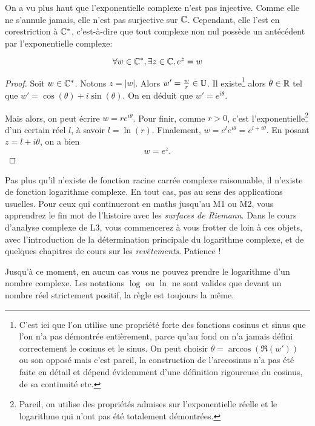 On a vu plus haut que l'exponentielle complexe n'est pas injective. Comme elle ne s'annule jamais, elle n'est pas surjective sur $\mathbb{C}$. Cependant, elle l'est en corestriction à $\mathbb{C}^*$, c'est-à-dire que tout complexe non nul possède un antécédent par l'exponentielle complexe:
\begin{proposition}
\[ \forall w\in\mathbb{C}^*, \exists z\in\mathbb{C}, e^z=w\]
\end{proposition}
\begin{proof}
Soit $w\in\mathbb{C}^*$. Notons $z=|w|$. Alors $w'=\frac{w}{r}\in\mathbb{U}$. Il existe\footnote{C'est ici que l'on utilise une propriété forte des fonctions cosinus et sinus que l'on n'a pas démontrée entièrement, parce qu'au fond on n'a jamais défini correctement le cosinus et le sinus. On peut choisir $\theta = \arccos(\Re(w'))$ ou son opposé mais c'est pareil, la construction de l'arccosinus n'a pas été faite en détail et dépend évidemment d'une définition rigoureuse du cosinus, de sa continuité etc.} alors $\theta\in\mathbb{R}$ tel que $w'=\cos(\theta)+i\sin(\theta)$. On en déduit que $w'=e^{i\theta}$.

Mais alors, on peut écrire $w=re^{i\theta}$. Pour finir, comme $r>0$, c'est l'exponentielle\footnote{Pareil, on utilise des propriétés admises sur l'exponentielle réelle et le logarithme qui n'ont pas été totalement démontrées.} d'un certain réel $l$, à savoir $l = \ln(r)$. Finalement, $w=e^le^{i\theta} = e^{l+i\theta}$. En posant $z=l+i\theta$, on a bien
\[ w = e^z.\]
\end{proof}

\begin{mdframed}
Pas plus qu'il n'existe de fonction \og racine carrée complexe\fg{} raisonnable, il n'existe de fonction \og logarithme complexe\fg. En tout cas, pas au sens des applications usuelles. Pour ceux qui continueront en maths jusqu'au M1 ou M2, vous apprendrez le fin mot de l'histoire avec les \emph{surfaces de Riemann}. Dans le cours d'analyse complexe de L3, vous commencerez à vous frotter de loin à ces objets, avec l'introduction de la \og détermination principale du logarithme complexe\fg, et de quelques chapitres de cours sur les \emph{revêtements}. Patience !

Jusqu'à ce moment, en aucun cas vous ne pouvez prendre le \og logarithme\fg{} d'un nombre complexe. Les notations $\log$ ou $\ln$ ne sont valides que devant un nombre réel strictement positif, la règle est toujours la même.
\end{mdframed}
